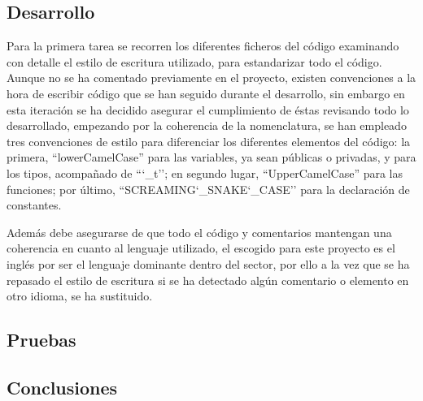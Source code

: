     \subsection{Desarrollo}
    
        Para la primera tarea se recorren los diferentes ficheros del código examinando con detalle el estilo de escritura utilizado, para estandarizar todo el código. Aunque no se ha comentado previamente en el proyecto, existen convenciones a la hora de escribir código que se han seguido durante el desarrollo, sin embargo en esta iteración se ha decidido asegurar el cumplimiento de éstas revisando todo lo desarrollado, empezando por la coherencia de la nomenclatura, se han empleado tres convenciones de estilo para diferenciar los diferentes elementos del código: la primera,  ``lowerCamelCase'' para las variables, ya sean públicas o privadas, y para los tipos, acompañado de ``\char`_t''; en segundo lugar, ``UpperCamelCase'' para las funciones; por último,  ``SCREAMING\char`_SNAKE\char`_CASE'' para la declaración de constantes.
        
        Además debe asegurarse de que todo el código y comentarios mantengan una coherencia en cuanto al lenguaje utilizado, el escogido para este proyecto es el inglés por ser el lenguaje dominante dentro del sector, por ello a la vez que se ha repasado el estilo de escritura si se ha detectado algún comentario o elemento en otro idioma, se ha sustituido.
    \subsection{Pruebas}
    \subsection{Conclusiones}